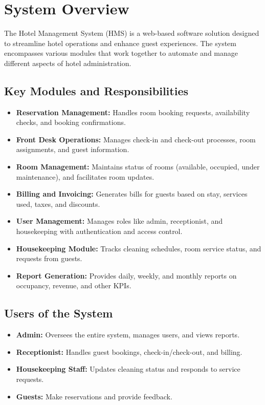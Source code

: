 \documentclass[a4paper,12pt]{article}
\begin{document}
\section{System Overview}
The Hotel Management System (HMS) is a web-based software solution designed to streamline hotel operations and enhance guest experiences. The system encompasses various modules that work together to automate and manage different aspects of hotel administration.

\subsection*{Key Modules and Responsibilities}

\begin{itemize}
    \item \textbf{Reservation Management:} Handles room booking requests, availability checks, and booking confirmations.
    \item \textbf{Front Desk Operations:} Manages check-in and check-out processes, room assignments, and guest information.
    \item \textbf{Room Management:} Maintains status of rooms (available, occupied, under maintenance), and facilitates room updates.
    \item \textbf{Billing and Invoicing:} Generates bills for guests based on stay, services used, taxes, and discounts.
    \item \textbf{User Management:} Manages roles like admin, receptionist, and housekeeping with authentication and access control.
    \item \textbf{Housekeeping Module:} Tracks cleaning schedules, room service status, and requests from guests.
    \item \textbf{Report Generation:} Provides daily, weekly, and monthly reports on occupancy, revenue, and other KPIs.
\end{itemize}

\subsection*{Users of the System}

\begin{itemize}
    \item \textbf{Admin:} Oversees the entire system, manages users, and views reports.
    \item \textbf{Receptionist:} Handles guest bookings, check-in/check-out, and billing.
    \item \textbf{Housekeeping Staff:} Updates cleaning status and responds to service requests.
    \item \textbf{Guests:} Make reservations and provide feedback.
\end{itemize}
\end{document}
